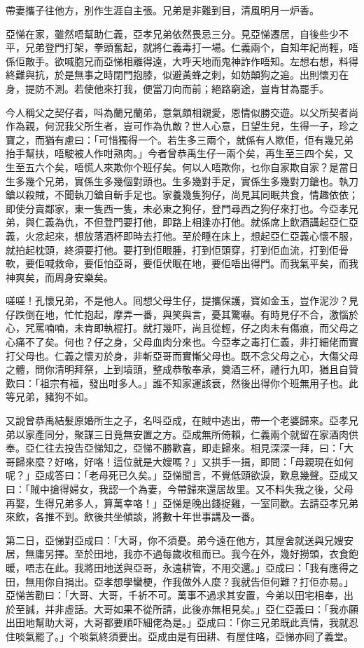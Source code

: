 \documentclass[a5paper, 12pt, openany]{book} %
\begin{document}
	帶妻攜子往他方，別作生涯自主張。兄弟是非難到目，清風明月一炉香。

	亞悌在家，雖然唔幫助仁義，亞孝兄弟依然畏忌三分。見亞悌遷居，自後些少不平，兄弟登門打架，拳頭奮起，就將仁義毒打一場。仁義兩个，自知年紀尚輕，唔係佢敵手。欲喊胞兄而亞悌相離得遠，大呼天地而鬼神詐作唔知。左想右想，料得終難與抗，於是無事之時閉門抱膝，似避黃蜂之刺，如妨顛狗之追。出則懷刃在身，提防不測。若使他來打我，便當刀向而前；絕路窮途，豈肯甘為罷手。

	今人稱父之契仔者，呌為蘭兄蘭弟，意氣頗相親愛，恩情似勝交遊。以父所契者尚作為親，何況我父所生者，豈可作為仇敵？世人心意，日望生兒，生得一子，珍之寶之，而猶有慮曰：「可惜獨得一个。若生多三兩个，就係有人欺佢，佢有幾兄弟抬手幫扶，唔駛被人作咁熟肉。」今者曾恭禹生仔一兩个矣，再生至三四个矣，又生至五六个矣，唔慌人來欺你个班仔矣。何以人唔欺你，乜你自家欺自家？是當日生多幾个兄弟，實係生多幾個對頭也。生多幾對手足，實係生多幾對刀鎗也。執刀鎗以殺賊，不聞執刀鎗自斬手足也。家養幾隻狗仔，尚見其同眠共食，情趣依依；即使分賣鄰家，東一隻西一隻，未必東之狗仔，登門尋西之狗仔來打也。今亞孝兄弟，與仁義為仇，不但登門要打他，即路上相逢亦打他。就係席上飲酒講起亞仁亞義，火忿起來，想放落酒杯即時去打他。至於睡在床上，想起亞仁亞義心懷不服，就拍起枕頭，終須要打他。要打到佢眼腫，打到佢頭穿，打到佢血流，打到佢骨軟，要佢喊救命，要佢怕亞哥，要佢伏眠在地，要佢唔出得門。而我氣平矣，而我神爽矣，而周身安樂矣。

	嗟嗟！孔懷兄弟，不是他人。囘想父母生仔，提攜保護，寶如金玉，豈作泥沙？見仔跌倒在地，忙忙抱起，摩弄一番，與笑與言，憂其驚嚇。有時見仔不合，激惱於心，咒罵喃喃，未肯即執棍打。就打幾吓，尚且從輕，仔之肉未有傷痕，而父母之心痛不了矣。何也？仔之身，父母血肉分來也。今亞孝之毒打仁義，非打細佬而實打父母也。仁義之懷刃於身，非斬亞哥而實慚父母也。既不念父母之心，大傷父母之體，問你清明拜祭，上到墳頭，整成恭敬奉承，奠酒三杯，禮行九叩，猶且自贊歎曰：「祖宗有福，發出咁多人。」誰不知家運該衰，然後出得你个班無用子也。此等兄弟，豬狗不如。

	又說曾恭禹結髮原婚所生之子，名呌亞成，在賊中逃出，帶一个老婆歸來。亞孝兄弟以家產同分，聚謀三日竟無安置之方。亞成無所倚賴，仁義兩个就留在家酒肉供奉。亞仁往去投告亞悌知之，亞悌不勝歡喜，即走歸來。相見深深一拜，曰：「大哥歸來麼？好咯，好咯！這位就是大嫂嗎？」又拱手一揖，即問：「母親現在如何呢？」亞成答曰：「老母死已久矣。」亞悌聞言，不覺低頭欲淚，歎息幾聲。亞成又曰：「賊中搶得婦女，我認一个為妻，今帶歸來還居故里。又不料失我之後，父母再娶，生得兄弟多人，算萬幸咯！」亞悌是晚出錢捉雞，一室同歡。去請亞孝兄弟來飲，各推不到。飲後共坐傾談，將數十年世事講及一番。

	第二日，亞悌對亞成曰：「大哥，你不須憂。弟今遠在他方，其屋舍就送與兄嫂安居，無庸另擇。至於田地，我亦不過每歲收租而已。我今在外，幾好撈頭，衣食飽暖，唔志在此。我將田地送與亞哥，永遠耕管，不用交還。」亞成曰：「我有應得之田，無用你自捐出。亞孝想學蠻梗，作我做外人麼？我就告佢何難？打佢亦易。」亞悌苦勸曰：「大哥、大哥，千祈不可。萬事不過求其安置，今弟以田宅相奉，出於至誠，并非虛話。大哥如果不從所請，此後亦無相見矣。」亞仁亞義曰：「我亦願出田地幫助大哥，大哥都要順吓細佬為是。」亞成曰：「你三兄弟既此真情，我就忍住啖氣罷了。」个啖氣終須要出。亞成由是有田耕、有屋住咯，亞悌亦囘了義堂。
\end{document}
